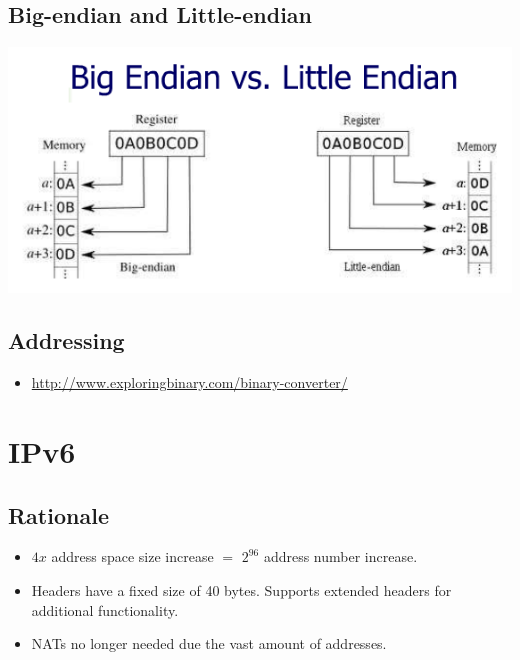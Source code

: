 \documentclass{article}
\begin{document}
\subsection{Big-endian and Little-endian}

\begin{center}
\includegraphics[scale=0.5]{images/BI-LI.png}\\[1cm]
\end{center}


\subsection{Addressing}

\begin{itemize}
	\item \url{http://www.exploringbinary.com/binary-converter/}
\end{itemize}


\newpage







\section{IPv6}


\subsection{Rationale}

\begin{itemize}
	\item $4x$ address space size increase $=$ $2^{96}$ address number increase.
	\item Headers have a fixed size of 40 bytes. Supports extended headers for additional functionality.
	\item NATs no longer needed due the vast amount of addresses.
\end{itemize}
\end{document}
